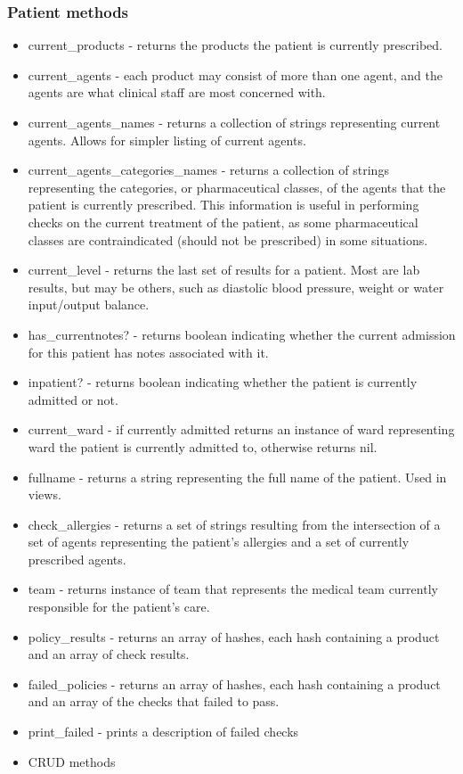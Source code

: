\documentclass[letterpaper]{amsart}
\begin{document}
\subsubsection{Patient methods}
\begin{itemize}
    \item current\_products - returns the products the patient is currently prescribed. 
    \item current\_agents  - each product may consist of more than one agent, and the agents are what clinical staff are most concerned with.
    \item current\_agents\_names - returns a collection of strings representing current agents.  Allows for simpler listing of current agents. 
    \item current\_agents\_categories\_names - returns a collection of strings representing the categories, or pharmaceutical classes, of the agents that the patient is currently prescribed.  This information is useful in performing checks on the current treatment of the patient, as some pharmaceutical classes are contraindicated (should not be prescribed) in some situations. 
    \item current\_level - returns the last set of results for a patient.  Most are lab results, but may be others, such as diastolic blood pressure, weight or water input/output balance. 
    \item has\_currentnotes? - returns boolean indicating whether the current admission for this patient has notes associated with it. 
    \item inpatient? - returns boolean indicating whether the patient is currently admitted or not. 
    \item current\_ward - if currently admitted returns an instance of ward representing ward the patient is currently admitted to, otherwise returns nil. 
    \item fullname - returns a string representing the full name of the patient.  Used in views. 
    \item check\_allergies - returns a set of strings resulting from the intersection of a set of agents representing the patient's allergies and a set of currently prescribed agents.
    \item team - returns instance of team that represents the medical team currently responsible for the patient's care. 
    \item policy\_results - returns an array of hashes, each hash containing a product and an array of check results. 
    \item failed\_policies - returns an array of hashes, each hash containing a product and an array of the checks that failed to pass. 
    \item print\_failed - prints a description of failed checks 
    \item CRUD methods
\end{itemize}
\end{document}
